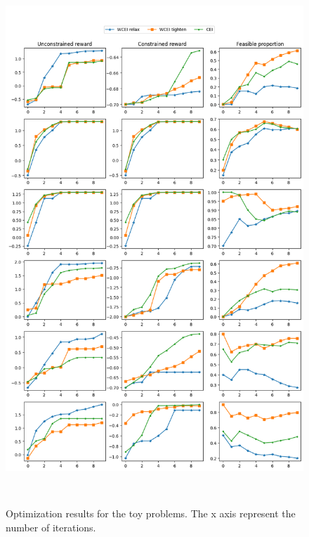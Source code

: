 \begin{figure}[h]
    \centering
    \includegraphics[width=\linewidth, height=20cm]{Figures/toy_res.png}
    \caption{Optimization results for the toy problems. The x axis represent the number of iterations.}
    \label{fig_toy_res}
\end{figure}



